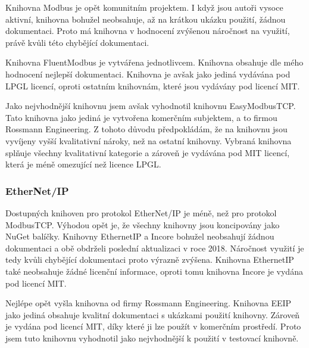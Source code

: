 Knihovna Modbus je opět komunitním projektem. I když jsou autoři vysoce aktivní, knihovna bohužel neobsahuje, až na krátkou ukázku použití, žádnou dokumentaci. Proto má knihovna v hodnocení zvýšenou náročnost na využití, právě kvůli této chybějící dokumentaci.  

Knihovna FluentModbus je vytvářena jednotlivcem. Knihovna obsahuje dle mého hodnocení nejlepší dokumentaci. Knihovna je avšak jako jediná vydávána pod LPGL licencí, oproti ostatním knihovnám, které jsou vydávány pod licencí MIT.

Jako nejvhodnější knihovnu jsem avšak vyhodnotil knihovnu EasyModbusTCP. Tato knihovna jako jediná je vytvořena komerčním subjektem, a to firmou Rossmann Engineering. Z tohoto důvodu předpokládám, že na knihovnu jsou vyvíjeny vyšší kvalitativní nároky, než na ostatní knihovny. 
Vybraná knihovna splňuje všechny kvalitativní kategorie a zároveň je vydávána pod MIT licencí, která je méně omezující než licence LPGL.

\subsubsection{EtherNet/IP}

Dostupných knihoven pro protokol EtherNet/IP je méně, než pro protokol ModbusTCP. Výhodou opět je, že všechny knihovny jsou koncipovány jako NuGet balíčky. Knihovny EthernetIP a Incore bohužel neobsahují žádnou dokumentaci a obě obdrželi poslední aktualizaci v roce 2018. Náročnost využití je tedy kvůli chybějící dokumentaci proto výrazně zvýšena. Knihovna EthernetIP také neobsahuje žádné licenční informace, oproti tomu knihovna Incore je vydána pod licencí MIT.

Nejlépe opět vyšla knihovna od firmy Rossmann Engineering. Knihovna EEIP jako jediná obsahuje kvalitní dokumentaci s ukázkami použití knihovny. Zároveň je vydána pod licencí MIT, díky které ji lze použít v komerčním prostředí. Proto jsem tuto knihovnu vyhodnotil jako nejvhodnější k použití v testovací knihovně.

\begin{table}[p!]\centering
    \caption{Seznam dostupných knihoven pro protokol ModbusTCP}
    \label{tab:modbus}
\end{table}

